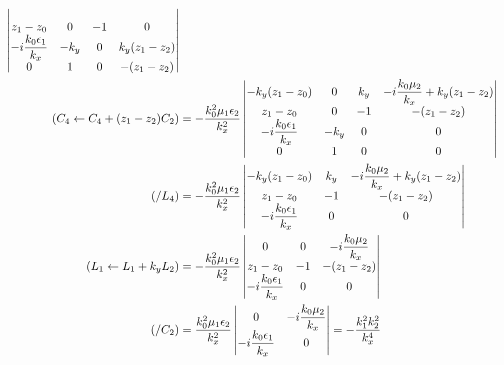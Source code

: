 {\begin{itshape}
\begin{align*}
\begin{vmatrix}
  \\
  z_1-z_0 & 0 & -1 & 0
  \\
  -i\dfrac{k_0\epsilon_1}{k_x} & - k_y & 0 & k_y (z_1-z_2)
  \\
  0 & 1 & 0 & -(z_1-z_2)
  \end{vmatrix}
  \\
  ( C_4 \leftarrow C_4 + (z_1-z_2)C_2  ) &= -\dfrac{k_0^2\mu_1\epsilon_2}{k_x^2}
  \begin{vmatrix} 
  -{k_y} (z_1-z_0) & 0 & k_y & -i\dfrac{k_0\mu_2}{k_x} + k_y(z_1-z_2)
  \\
  z_1-z_0 & 0 & -1 & -(z_1-z_2)
  \\
  -i\dfrac{k_0\epsilon_1}{k_x} & - k_y & 0 & 0
  \\
  0 & 1 & 0 & 0
  \end{vmatrix}
  \\
  ( / L_4  ) &= -\dfrac{k_0^2\mu_1\epsilon_2}{k_x^2}
  \begin{vmatrix} 
  -{k_y} (z_1-z_0) & k_y & -i\dfrac{k_0\mu_2}{k_x} + k_y(z_1-z_2)
  \\
  z_1-z_0 & -1 & -(z_1-z_2)
  \\
  -i\dfrac{k_0\epsilon_1}{k_x} & 0 & 0
  \end{vmatrix}
  \\
  ( L_1  \leftarrow L_1 + k_y L_2) &= -\dfrac{k_0^2\mu_1\epsilon_2}{k_x^2}
  \begin{vmatrix} 
  0 & 0 & -i\dfrac{k_0\mu_2}{k_x}
  \\
  z_1-z_0 & -1 & -(z_1-z_2)
  \\
  -i\dfrac{k_0\epsilon_1}{k_x} & 0 & 0
  \end{vmatrix}
  \\
  ( / C_2 ) &= \dfrac{k_0^2\mu_1\epsilon_2}{k_x^2}
  \begin{vmatrix} 
  0 & -i\dfrac{k_0\mu_2}{k_x}
  \\
  -i\dfrac{k_0\epsilon_1}{k_x} & 0
  \end{vmatrix}
  = -\dfrac{k_1^2k_2^2}{k_x^4}
  \end{align*}
  \end{itshape}
  }